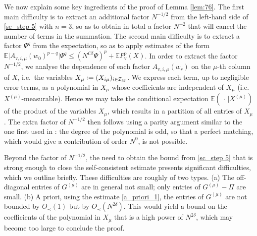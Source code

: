 \documentclass[11pt]{article} %
\numberwithin{equation}{section}
\numberwithin{figure}{section}
\theoremstyle{plain} %
\theoremstyle{definition} %
\newcommand{\f}[1]{\boldsymbol{\mathrm{#1}}} %
\renewcommand{\cal}{\mathcal}
\newcommand{\E}{\mathbb{E}}
\newcommand*{\deq}{\mathrel{\vcenter{\baselineskip0.65ex \lineskiplimit0pt \hbox{.}\hbox{.}}}=}
\renewcommand{\leq}{\leqslant}
\newcommand{\abs}[1]{\lvert #1 \rvert}
\begin{document}
We now explain some key ingredients of the proof of Lemma \ref{lem:76}. The first main difficulty is to extract an additional factor $N^{-1/2}$ from the left-hand side of \eqref{sc_step 5} with $n = 3$, so as to obtain in total a factor $N^{-2}$ that will cancel the number of terms in the summation. The second main difficulty is to extract a factor $\Psi^q$ from the expectation, so as to apply estimates of the form $\E \abs{A_{\f v,i, \mu}(w_0)^{p - q}} \Psi^q \leq (N^{C \delta} \Psi)^p + \E F^p_{\f v}(X)$. In order to extract the factor $N^{-1/2}$, we analyse the dependence of each factor $A_{\f v,i, \mu}(w_r)$ on the $\mu$-th column of $X$, i.e.\ the variables $X_\mu \deq (X_{i \mu})_{i \in \cal I_M}$. We express each term, up to negligible error terms, as a polynomial in $X_\mu$ whose coefficients are independent of $X_\mu$ (i.e.\ $X^{(\mu)}$-measurable). Hence we may take the conditional expectation $\E(\,\cdot\, \vert X^{(\mu)})$ of the product of the variables $X_\mu$, which results in a partition of all entries of $X_\mu$. The extra factor of $N^{-1/2}$ then follows using a parity argument similar to the one first used in \cite{BEKYY}: the degree of the polynomial is odd, so that a perfect matching, which would give a contribution of order $N^0$, is not possible.

Beyond the factor of $N^{-1/2}$, the need to obtain the bound from \eqref{sc_step 5} that is strong enough to close the self-consistent estimate presents significant difficulties, which we outline briefly. These difficulties are roughly of two types. (a) The off-diagonal entries of $G^{(\mu)}$ are in general not small; only entries of $G^{(\mu)} - \Pi$ are small. (b) A priori, using the estimate \eqref{a_priori_1}, the entries of $G^{(\mu)}$ are not bounded by $O_\prec(1)$ but by $O_\prec(N^{2 \delta})$. This would yield a bound on the coefficients of the polynomial in $X_\mu$ that is a high power of $N^{2 \delta}$, which may become too large to conclude the proof.
\end{document}
